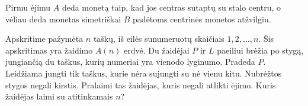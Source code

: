 \begin{sprendimas}
  Pirmu ėjimu $A$ deda monetą taip, kad jos centras sutaptų su stalo centru, o
  vėliau deda monetas simetriškai $B$ padėtoms centrinės monetos atžvilgiu. 
\end{sprendimas}

\begin{pavnr}
  Apskritime pažymėta $n$ taškų, iš eilės sunumeruotų skaičiais $1,2,\ldots,n$. Šis
  apskritimas yra žaidimo $A(n)$ erdvė. Du žaidėjai $P$ ir $L$ paeiliui brėžia po
  stygą, jungiančią du taškus, kurių numeriai yra vienodo lyginumo. Pradeda
  $P$. Leidžiama jungti tik taškus, kurie nėra sujungti su nė vienu kitu.
  Nubrėžtos stygos negali kirstis. Pralaimi tas žaidėjas, kuris negali
  atlikti ėjimo. Kuris žaidėjas laimi su atitinkamais $n$?
\end{pavnr}

